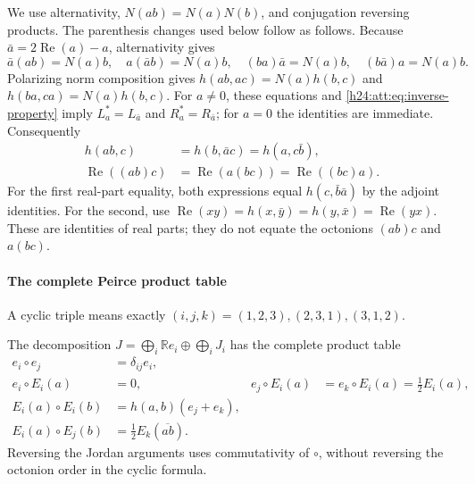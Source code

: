We use alternativity, $N(ab)=N(a)N(b)$, and conjugation reversing
products. The parenthesis changes used below follow as follows.
Because $\bar a=2\operatorname{Re}(a)-a$, alternativity gives
\begin{equation}
 \bar a(ab)=N(a)b,\quad a(\bar a b)=N(a)b,\quad
 (ba)\bar a=N(a)b,\quad (b\bar a)a=N(a)b.
 \label{h24:att:eq:inverse-property}
\end{equation}
Polarizing norm composition gives
$h(ab,ac)=N(a)h(b,c)$ and $h(ba,ca)=N(a)h(b,c)$.
For $a\ne0$, these equations and \eqref{h24:att:eq:inverse-property}
imply $L_a^*=L_{\bar a}$ and $R_a^*=R_{\bar a}$; for $a=0$
the identities are immediate. Consequently
\begin{align}
 h(ab,c)&=h(b,\bar a c)=h(a,c\bar b),\nonumber\\
 \operatorname{Re}((ab)c)&=\operatorname{Re}(a(bc))
                         =\operatorname{Re}((bc)a).
 \label{h24:att:eq:real-associativity}
\end{align}
For the first real-part equality, both expressions equal
$h(c,\bar b\bar a)$ by the adjoint identities. For the second, use
$\operatorname{Re}(xy)=h(x,\bar y)=h(y,\bar x)=\operatorname{Re}(yx)$.
These are identities of real parts; they do not equate the octonions
$(ab)c$ and $a(bc)$.

\paragraph{The complete Peirce product table}

A cyclic triple means exactly $(i,j,k)=(1,2,3),(2,3,1),(3,1,2)$.

\begin{proposition}\label{h24:att:prop:peirce}
The decomposition $J=\bigoplus_i\mathbb R e_i\oplus\bigoplus_iJ_i$
has the complete product table
\begin{align}
 e_i\circ e_j&=\delta_{ij}e_i,\nonumber\\
 e_i\circ E_i(a)&=0,&
 e_j\circ E_i(a)&=e_k\circ E_i(a)=\tfrac12E_i(a),\nonumber\\
 E_i(a)\circ E_i(b)&=h(a,b)(e_j+e_k),\label{h24:att:eq:peirce-table}\\
 E_i(a)\circ E_j(b)&=\tfrac12E_k(\overline{ab}).\nonumber
\end{align}
Reversing the Jordan arguments uses commutativity of $\circ$,
without reversing the octonion order in the cyclic formula.
\end{proposition}

